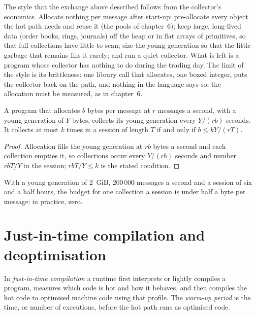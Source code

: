 The style that the exchange above described follows from the collector's economics. Allocate nothing per message after
start-up: pre-allocate every object the hot path needs and reuse it (the pools of chapter~6); keep large, long-lived data
(order books, rings, journals) off the heap or in flat arrays of primitives, so that full collections have little to scan;
size the young generation so that the little garbage that remains fills it rarely; and run a quiet collector. What is
left is a program whose collector has nothing to do during the trading day. The limit of the style is its brittleness:
one library call that allocates, one boxed integer, puts the collector back on the path, and nothing in the language says
so; the allocation must be measured, as in chapter~6.

\begin{proposition}\label{prop:ll:managed-and-functional-languages-on-the-desk:budget}
A program that allocates $b$ bytes per message at $r$ messages a second, with a young generation of $Y$ bytes, collects its
young generation every $Y/(rb)$ seconds. It collects at most $k$ times in a session of length $T$ if and only if
$b \le kY/(rT)$.
\end{proposition}

\begin{proof}
Allocation fills the young generation at $rb$ bytes a second and each collection empties it, so collections occur every
$Y/(rb)$ seconds and number $rbT/Y$ in the session; $rbT/Y \le k$ is the stated condition.
\end{proof}

With a young generation of 2~GiB, 200\,000 messages a second and a session of six and a half hours, the budget for one
collection a session is under half a byte per message: in practice, zero.

\section{Just-in-time compilation and deoptimisation}

\begin{definition}\label{def:ll:managed-and-functional-languages-on-the-desk:jit}
In \emph{just-in-time compilation} a runtime first interprets or lightly compiles a program,
measures which code is hot and how it behaves, and then compiles the hot code to optimised machine code using that profile.
The \emph{warm-up period} is the time, or number of executions, before the hot path runs as optimised
code.
\end{definition}

